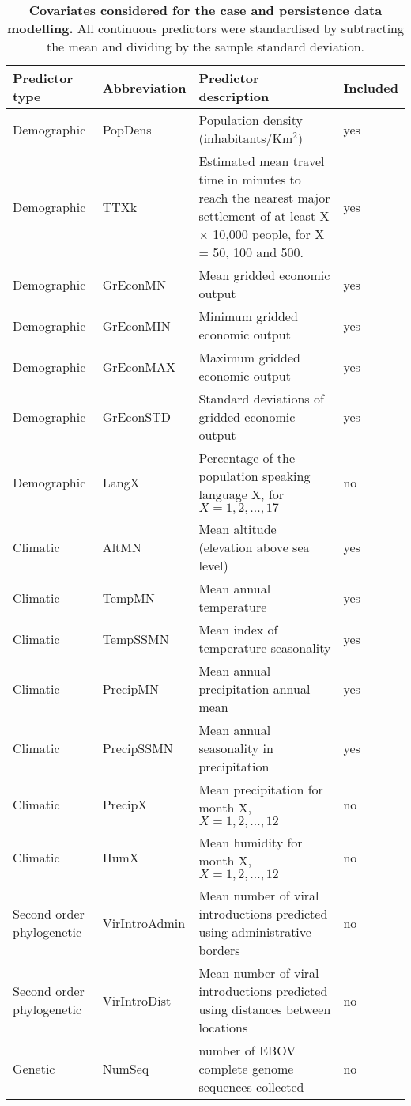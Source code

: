 \begin{minipage}{\textwidth}  
\setcounter{mpfootnote}{\value{footnote}}
\renewcommand{\thempfootnote}{\arabic{mpfootnote}}
\fontsize{9}{11}\selectfont
\begin{longtable}{ | l | l | p{} | l | }
\caption[Covariates considered for the case and persistence data modelling.]{\textbf{Covariates considered for the case and persistence data modelling.} All continuous predictors were standardised by subtracting the mean and dividing by the sample standard deviation.}
\label{tab:predictorTable}\\
\hline
Predictor type & Abbreviation & Predictor description & Included\footnotemark[1]\\
\hline
Demographic & PopDens & Population density (inhabitants/Km$^2$) & yes\\ 
\hline
Demographic & TTXk & Estimated mean travel time in minutes to reach the nearest major settlement of at least X $\times$ 10,000 people, for X = 50, 100 and 500. & yes\\ 
\hline
Demographic & GrEconMN & Mean gridded economic output & yes\\ 
\hline
Demographic & GrEconMIN & Minimum gridded economic output & yes\\ 
\hline
Demographic & GrEconMAX & Maximum gridded economic output & yes\\ 
\hline
Demographic & GrEconSTD & Standard deviations of gridded economic output & yes \\ 
\hline
Demographic & LangX & Percentage of the population speaking language X, for $X = 1, 2, \ldots, 17$ & no\\ 
\hline
Climatic & AltMN & Mean altitude (elevation above sea level)& yes\\ 
\hline
Climatic & TempMN & Mean annual temperature & yes \\ 
\hline
Climatic & TempSSMN & Mean index of temperature seasonality & yes\\ 
\hline
Climatic & PrecipMN & Mean annual precipitation annual mean & yes\\ 
\hline
Climatic & PrecipSSMN & Mean annual seasonality in precipitation & yes\\ 
\hline
Climatic & PrecipX & Mean precipitation for month X, $X = 1, 2, \ldots, 12$ & no\\ 
\hline
Climatic & HumX & Mean humidity for month X, $X = 1, 2, \ldots, 12$ & no\\ 
\hline
Second order phylogenetic & VirIntroAdmin & Mean number of viral introductions predicted using administrative borders & no\\ 
\hline
Second order phylogenetic & VirIntroDist & Mean number of viral introductions predicted using distances between locations & no\\ 
\hline
Genetic & NumSeq & number of EBOV complete genome sequences collected & no\\ 
\hline
\end{longtable}
\setcounter{footnote}{\value{mpfootnote}}
\end{minipage}


